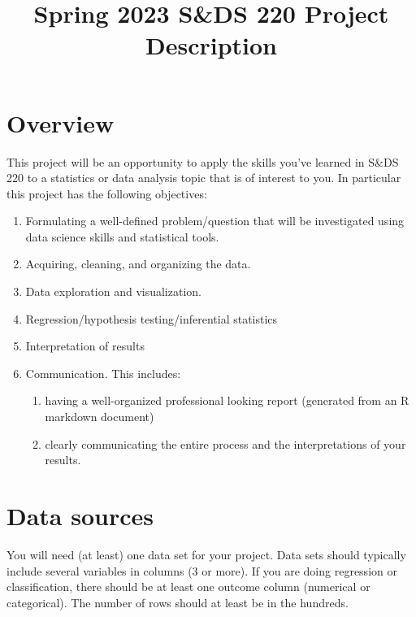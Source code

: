 \documentclass[
]{article}
\title{Spring 2023 S\&DS 220 Project Description}
\author{}
\date{\vspace{-2.5em}}
\providecommand{\tightlist}{%
  \setlength{\itemsep}{0pt}\setlength{\parskip}{0pt}}
\begin{document}
\maketitle

{
\hypersetup{linkcolor=}
\setcounter{tocdepth}{2}
\tableofcontents
}
\hypertarget{overview}{%
\section{Overview}\label{overview}}

This project will be an opportunity to apply the skills you've learned
in S\&DS 220 to a statistics or data analysis topic that is of interest
to you. In particular this project has the following objectives:

\begin{enumerate}
\def\labelenumi{\arabic{enumi}.}
\tightlist
\item
  Formulating a well-defined problem/question that will be investigated
  using data science skills and statistical tools.
\item
  Acquiring, cleaning, and organizing the data.
\item
  Data exploration and visualization.
\item
  Regression/hypothesis testing/inferential statistics
\item
  Interpretation of results
\item
  Communication. This includes:

  \begin{enumerate}
  \def\labelenumii{\alph{enumii}.}
  \tightlist
  \item
    having a well-organized professional looking report (generated from
    an R markdown document)
  \item
    clearly communicating the entire process and the interpretations of
    your results.
  \end{enumerate}
\end{enumerate}

\hypertarget{data-sources}{%
\section{Data sources}\label{data-sources}}

You will need (at least) one data set for your project. Data sets should
typically include several variables in columns (3 or more). If you are
doing regression or classification, there should be at least one outcome
column (numerical or categorical). The number of rows should at least be
in the hundreds.
\end{document}
